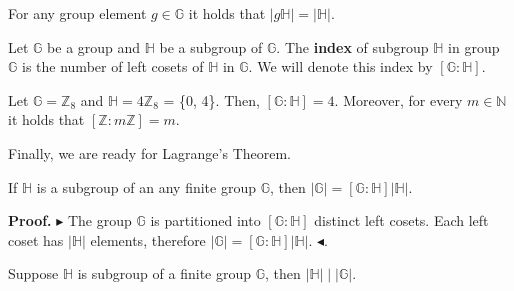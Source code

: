\documentclass[../lecture-notes-148x210.tex]{subfiles}
\begin{document}
\begin{lemma}
    For any group element $g \in \mathbb{G}$ it holds that $\left| g\mathbb{H} \right| = \left| \mathbb{H} \right|$.
\end{lemma}

\begin{definition}
    Let $\mathbb{G}$ be a group and $\mathbb{H}$ be a subgroup of $\mathbb{G}$.
    The \textbf{index} of subgroup $\mathbb{H}$ in group $\mathbb{G}$ is the
    number of left cosets of $\mathbb{H}$ in $\mathbb{G}$. We will denote this
    index by $\left[ \mathbb{G} : \mathbb{H} \right]$.
\end{definition}

\begin{example}
    Let $\mathbb{G} = \mathbb{Z}_{8}$ and $\mathbb{H} = 4\mathbb{Z}_{8}$ = \{0,
    4\}. Then, $\left[ \mathbb{G} : \mathbb{H} \right] = 4$. Moreover, for every
    $m \in \mathbb{N}$ it holds that $\left[ \mathbb{Z} : m \mathbb{Z} \right] =
    m$.
\end{example}


Finally, we are ready for Lagrange's Theorem.

\begin{theorem} [Lagrange]
    If $\mathbb{H}$ is a subgroup of an any finite group $\mathbb{G}$, 
    then $\left| \mathbb{G} \right| = \left[ \mathbb{G} : \mathbb{H} \right] \left| \mathbb{H} \right|$.
\end{theorem}

\textbf{Proof.} 
$\blacktriangleright$ 
The group $\mathbb{G}$ is partitioned into $\left[ \mathbb{G} : \mathbb{H} \right]$ distinct left cosets.
Each left coset has $\left| \mathbb{H} \right|$ elements, therefore 
$\left|\mathbb{G}\right| = \left[ \mathbb{G} : \mathbb{H} \right] \left| \mathbb{H} \right|$.
$\blacktriangleleft$.

\begin{corollary}
    Suppose $\mathbb{H}$ is subgroup of a finite group $\mathbb{G}$, 
    then $\left| \mathbb{H} \right| \mid \left| \mathbb{G} \right|$.
\end{corollary}
\end{document}
